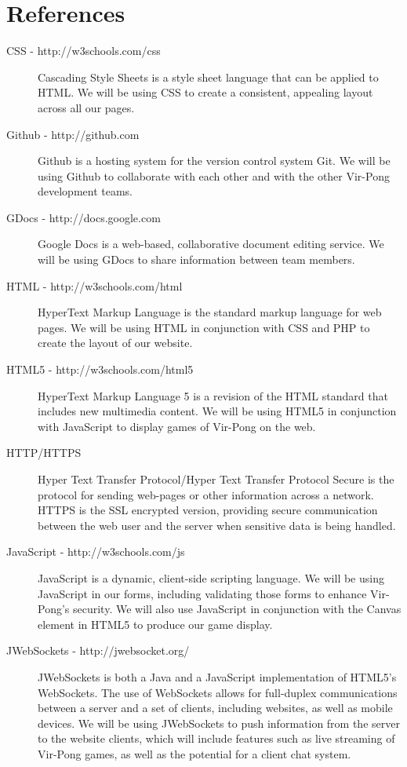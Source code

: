 \section{References}
	\begin{description}
		\item[CSS - http://w3schools.com/css] Cascading Style Sheets is a style sheet language that can be applied to HTML. We will be using CSS to create a consistent, appealing layout across all our pages.
		\item[Github - http://github.com] Github is a hosting system for the version control system Git. We will be using Github to collaborate with each other and with the other Vir-Pong development teams.
		\item[GDocs - http://docs.google.com] Google Docs is a web-based, collaborative document editing service. We will be using GDocs to share information between team members.
		\item[HTML - http://w3schools.com/html] HyperText Markup Language is the standard markup language for web pages. We will be using HTML in conjunction with CSS and PHP to create the layout of our website.
		\item[HTML5 - http://w3schools.com/html5] HyperText Markup Language 5 is a revision of the HTML standard that includes new multimedia content. We will be using HTML5 in conjunction with JavaScript to display games of Vir-Pong on the web.
		\item[HTTP/HTTPS] Hyper Text Transfer Protocol/Hyper Text Transfer Protocol Secure is the  protocol for sending web-pages or other information across a network. HTTPS is the SSL encrypted version, providing secure communication between the web user and the server when sensitive data is being handled.
		\item[JavaScript - http://w3schools.com/js] JavaScript is a dynamic, client-side scripting language. We will be using JavaScript in our forms, including validating those forms to enhance Vir-Pong's security. We will also use JavaScript in conjunction with the Canvas element in HTML5 to produce our game display.
		\item[JWebSockets - http://jwebsocket.org/] JWebSockets is both a Java and a JavaScript implementation of HTML5's WebSockets. The use of WebSockets allows for full-duplex communications between a server and a set of clients, including websites, as well as mobile devices. We will be using JWebSockets to push information from the server to the website clients, which will include features such as live streaming of Vir-Pong games, as well as the potential for a client chat system.

\end{description}
